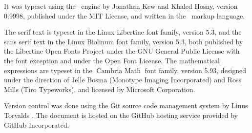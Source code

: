 \documentclass[10pt, a4paper, twoside]{lecturenotes}
\begin{document}
It was typeset using the \XeTeX\ engine by Jonathan Kew and Khaled Hosny, version 0.9998, published under the MIT
License, and written in the \XeLaTeX\ markup language.

The serif text is typeset in the Linux Libertine font family, version 5.3, and the sans serif text in the \textsf{Linux Biolinum} font family, version 5.3, both published by the Libertine Open Fonts Project under the GNU
General Public License with the font exception and under the Open Font License. The mathematical expressions are typeset in the $\operatorname{Cambria~Math}$ font family, version 5.93, designed under the direction of Jelle Bosma (Monotype Imaging Incorporated) and Ross Mills (Tiro Typeworks), and licensed by Microsoft Corporation.

Version control was done using the Git source code management system by Linus Torvalds . The document is hosted on the GitHub hosting service provided by GitHub Incorporated.
\end{document}
